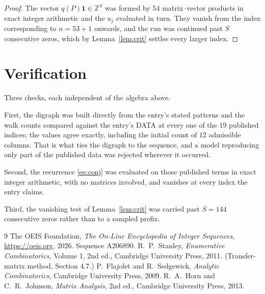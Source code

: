 \documentclass[11pt,a4paper]{article}
\theoremstyle{plain}
\theoremstyle{definition}
\begin{document}
\begin{proof}
The vector $q(P)\mathbf{1}\in\mathbb{Z}^{S}$ was formed by $54$ matrix--vector
products in exact integer arithmetic and the $u_j$ evaluated in turn. They vanish from the
index corresponding to $n=53+1$ onwards, and the run was continued past $S$ consecutive
zeros, which by Lemma~\ref{lem:crit} settles every larger index.
\end{proof}

\section{Verification}

Three checks, each independent of the algebra above.

First, the digraph was built directly from the entry's stated patterns and the walk counts
compared against the entry's DATA at every one of the $19$ published indices; the
values agree exactly, including the initial count of $12$ admissible columns. That is
what ties the digraph to the sequence, and a model reproducing only part of the published
data was rejected wherever it occurred.

Second, the recurrence \eqref{eq:conj} was evaluated on those published terms in exact
integer arithmetic, with no matrices involved, and vanishes at every index the entry claims.

Third, the vanishing test of Lemma~\ref{lem:crit} was carried past $S=144$ consecutive
zeros rather than to a sampled prefix.

\begin{thebibliography}{9}
 The OEIS Foundation, \emph{The On-Line Encyclopedia of Integer
Sequences}, \url{https://oeis.org}, 2026. Sequence A206890.
 R.~P.~Stanley, \emph{Enumerative Combinatorics}, Volume 1, 2nd ed.,
Cambridge University Press, 2011. (Transfer-matrix method, Section 4.7.)
 P.~Flajolet and R.~Sedgewick, \emph{Analytic Combinatorics}, Cambridge
University Press, 2009.
 R.~A.~Horn and C.~R.~Johnson, \emph{Matrix Analysis}, 2nd ed., Cambridge
University Press, 2013.
\end{thebibliography}
\end{document}
